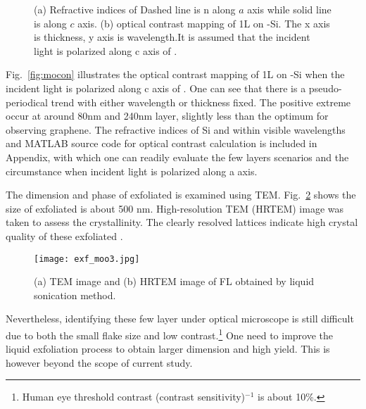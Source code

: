 \begin{figure}[htb]
\centering
{}\hspace{0.04\textwidth}
\caption[Refractive indices of ]{(a) Refractive indices of  Dashed line is n along $a$ axis while solid line is along $c$ axis. (b) optical contrast mapping of 1L  on -Si. The x axis is  thickness, y axis is wavelength.It is assumed that the incident light is polarized along c axis of .}
\label{fig:mofl}
\end{figure}

Fig.~\ref{fig:mocon} illustrates the optical contrast mapping of 1L  on -Si when the incident light is polarized along c axis of . One can see that there is a pseudo-periodical trend with either wavelength or  thickness fixed. The positive extreme occur at around 80nm and 240nm  layer, slightly less than the optimum for observing graphene. The refractive indices of Si and  within visible wavelengths and MATLAB source code for optical contrast calculation is included in Appendix, with which one can readily evaluate the few layers  scenarios and the circumstance when incident light is polarized along a axis.

The dimension and phase of exfoliated  is examined using TEM. Fig.~\ref{fig:motem} shows the size of exfoliated  is about 500 nm. High-resolution TEM (HRTEM) image was taken to assess the  crystallinity. The clearly resolved lattices indicate high crystal quality of these exfoliated .

\begin{figure}[htb]
\centering
\texttt{[image: exf\_moo3.jpg]}
\caption[TEM images of exfoliated ]{(a) TEM image and (b) HRTEM image of FL  obtained by liquid sonication method.}
\label{fig:motem}
\end{figure}

Nevertheless, identifying these few layer  under optical microscope is still difficult due to both the small flake size and low contrast.\footnote{Human eye threshold contrast (contrast sensitivity)$^{-1}$ is about 10\%.} One need to improve the liquid exfoliation process to obtain larger dimension and high yield. This is however beyond the scope of current study.

